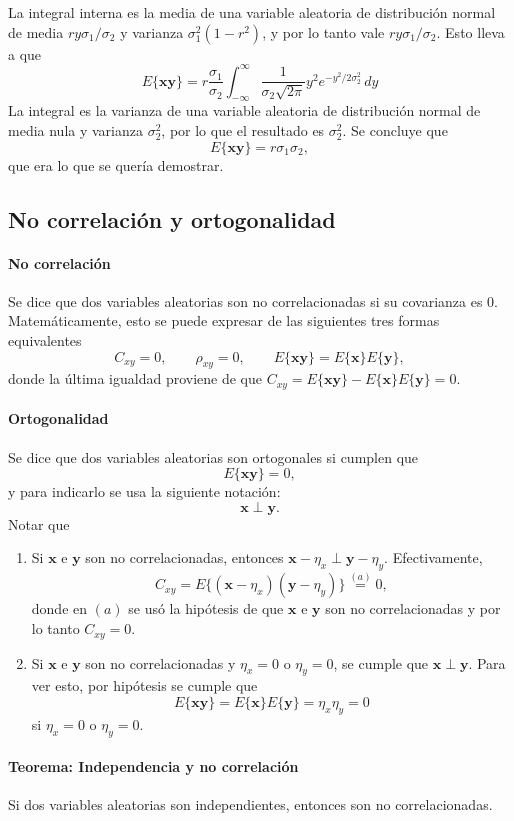 \documentclass[a4paper]{report}
\newcommand{\x}{\mathbf{x}}
\newcommand{\y}{\mathbf{y}}
\begin{document}
\normalsize
La integral interna es la media de una variable aleatoria de distribución normal de media \(ry\sigma_1/\sigma_2\) y varianza \(\sigma_1^2(1-r^2)\), y por lo tanto vale \(ry\sigma_1/\sigma_2\). Esto lleva a que
\[
 E\{\x\y\}=r\frac{\sigma_1}{\sigma_2}\int_{-\infty}^{\infty}\frac{1}{\sigma_2\sqrt{2\pi}}y^2e^{-y^2/2\sigma_2^2}\,dy
\]
La integral es la varianza de una variable aleatoria de distribución normal de media nula y varianza \(\sigma_2^2\), por lo que el resultado es \(\sigma_2^2\). Se concluye que
\[
 E\{\x\y\}=r\sigma_1\sigma_2,
\]
que era lo que se quería demostrar.

\subsection{No correlación y ortogonalidad}\label{sec:uncorrelation_and_onthogonality}

\paragraph{No correlación} Se dice que dos variables aleatorias son no correlacionadas si su covarianza es 0. Matemáticamente, esto se puede expresar de las siguientes tres formas equivalentes
\[
 C_{xy}=0,\qquad \rho_{xy}=0,\qquad E\{\x\y\}=E\{\x\}E\{\y\},
\]
donde la última igualdad proviene de que \(C_{xy}=E\{\x\y\}-E\{\x\}E\{\y\}=0\).

\paragraph{Ortogonalidad} Se dice que dos variables aleatorias son ortogonales si cumplen que
\[
 E\{\x\y\}=0,
\]
y para indicarlo se usa la siguiente notación:
\[
 \x\perp\y.
\]
Notar que
\begin{enumerate}[\((a)\)]
 \item Si \(\x\) e \(\y\) son no correlacionadas, entonces \(\x-\eta_x\perp\y-\eta_y\). Efectivamente,
 \[
  C_{xy}=E\{(\x-\eta_x)(\y-\eta_y)\}\overset{(a)}{=}0,
 \]
 donde en \((a)\) se usó la hipótesis de que \(\x\) e \(\y\) son no correlacionadas y por lo tanto \(C_{xy}=0\).
 \item Si \(\x\) e \(\y\) son no correlacionadas y \(\eta_x=0\) o \(\eta_y=0\), se cumple que \(\x\perp\y\). Para ver esto, por hipótesis se cumple que
 \[
  E\{\x\y\}=E\{\x\}E\{\y\}=\eta_x\eta_y=0
 \]
 si \(\eta_x=0\) o \(\eta_y=0\).
\end{enumerate}

\paragraph{Teorema: Independencia y no correlación} Si dos variables aleatorias son independientes, entonces son no correlacionadas. 
\end{document}
